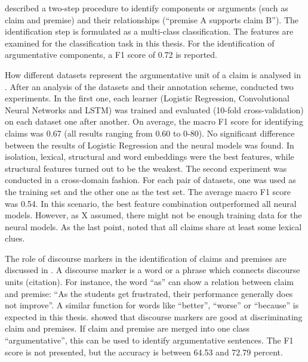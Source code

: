 \cite{Stab2014Identifying-Arg} described a two-step procedure to identify components or arguments (such as claim and premise) and their relationships (\enquote{premise A supports claim B}). The identification step is formulated as a multi-class classification. The features are examined for the classification task in this thesis. For the identification of argumentative components, a F1 score of 0.72 is reported.

How different datasets represent the argumentative unit of a claim is analysed in \cite{Daxenberger2017What-is-the-Ess}. After an analysis of the datasets and their annotation scheme, \cite{Daxenberger2017What-is-the-Ess} conducted two experiments.
In the first one, each learner (Logistic Regression, Convolutional Neural Networks and LSTM) was trained and evaluated (10-fold cross-validation) on each dataset one after another. On average, the macro F1 score for identifying claims was 0.67 (all results ranging from 0.60 to 0-80). No significant difference between the results of Logistic Regression and the neural models was found. In isolation, lexical, structural and word embeddings were the best features, while structural features turned out to be the weakest.
The second experiment was conducted in a cross-domain fashion. For each pair of datasets, one was used as the training set and the other one as the test set. The average macro F1 score was 0.54. In this scenario, the best feature combination outperformed all neural models. However, as X assumed, there might not be enough training data for the neural models.
As the last point, \cite{Daxenberger2017What-is-the-Ess} noted that all claims share at least some lexical clues.


The role of discourse markers in the identification of claims and premises are discussed in \cite{Eckle-Kohler2015On-the-Role-of-}. A discourse marker is a word or a phrase which connects discourse units (citation). For instance, the word \enquote{as} can show a relation between claim and premise: \enquote{As the students get frustrated, their performance generally does not improve}.  A similar function for words like \enquote{better}, \enquote{worse} or \enquote{because} is expected in this thesis. \cite{Eckle-Kohler2015On-the-Role-of-} showed that discourse markers are good at discriminating claim and premises. If claim and premise are merged into one class \enquote{argumentative}, this can be used to identify argumentative sentences. The F1 score is not presented, but the accuracy is between 64.53 and 72.79 percent.

